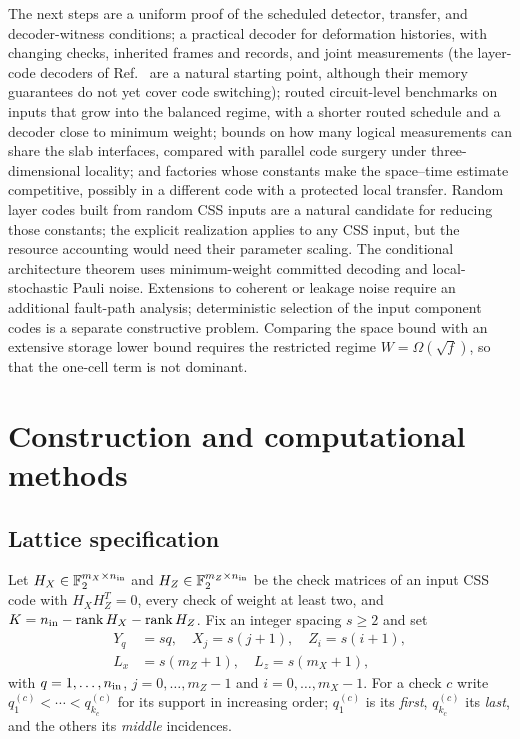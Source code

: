 The next steps are a uniform proof of the scheduled detector, transfer,
and decoder-witness conditions; a practical decoder for deformation histories, with
changing checks, inherited frames and records, and joint measurements (the
layer-code decoders of Ref.~\cite{GuRandomLayerCodes2026} are a natural starting
point, although their memory guarantees do not yet cover code switching);
routed circuit-level benchmarks on inputs that grow into the balanced regime,
with a shorter routed schedule and a decoder close to minimum weight; bounds
on how many logical measurements can share
the slab interfaces, compared with parallel code surgery
\cite{CowtanParallelSurgery} under three-dimensional locality; and factories
whose constants make the space--time estimate competitive, possibly in a
different code with a protected local transfer. Random
layer codes built from random CSS inputs \cite{GuRandomLayerCodes2026} are a
natural candidate for reducing those constants; the explicit realization
applies to any CSS input, but the resource accounting would need their
parameter scaling. The conditional architecture theorem uses minimum-weight committed decoding and
local-stochastic Pauli noise. Extensions to coherent or leakage noise require
an additional fault-path analysis; deterministic selection of the input
component codes is a separate constructive problem. Comparing the space
bound with an extensive storage lower bound requires the restricted regime
$W=\Omega(\sqrt f)$, so that the one-cell term is not dominant.


\section{Construction and computational methods}
\label{sec:methods}
\subsection{Lattice specification}
\label{sec:construction-details}
Let $H_X\in\mathbb F_2^{m_X\times n_{\rm in}}$ and
$H_Z\in\mathbb F_2^{m_Z\times n_{\rm in}}$ be the check matrices of an input
CSS code with $H_XH_Z^T=0$, every check of weight at least two, and
$K=n_{\rm in}-\operatorname{rank} H_X-\operatorname{rank} H_Z$.  Fix an integer spacing $s\ge2$ and set
\begin{align}
 Y_q&=sq,\quad X_j=s(j+1),\quad Z_i=s(i+1),\nonumber\\
 L_x&=s(m_Z+1),\quad L_z=s(m_X+1),
 \label{eq:explicit-coords}
\end{align}
with $q=1,\dots,n_{\rm in}$, $j=0,\dots,{m_Z-1}$ and $i=0,\dots,{m_X-1}$.
For a check $c$ write $q_1^{(c)}<\cdots<q_{k_c}^{(c)}$ for its support in
increasing order; $q_1^{(c)}$ is its \emph{first}, $q_{k_c}^{(c)}$ its
\emph{last}, and the others its \emph{middle} incidences.

